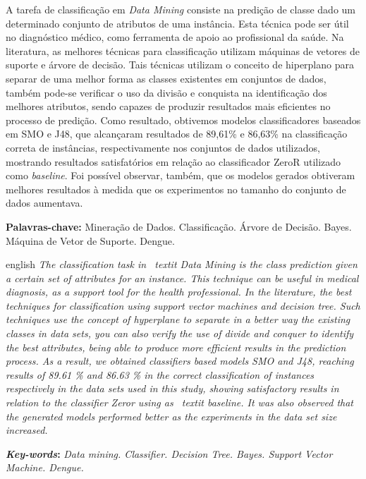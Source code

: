 \documentclass[
	12pt,				%
	openright,			%
	oneside,	
	a4paper,				%
	english,				%
	brazil				%
]{abntex2/abntex2} %
\begin{document}
\setlength{\absparsep}{18pt} %
\begin{resumo}

 	A tarefa de classificação em \textit{Data Mining} consiste na predição de classe dado um determinado conjunto de atributos de uma instância. Esta técnica pode ser útil no diagnóstico médico, como ferramenta de apoio ao profissional da saúde. Na literatura, as melhores técnicas para classificação utilizam máquinas de vetores de suporte e árvore de decisão. Tais técnicas utilizam o conceito de hiperplano para separar de uma melhor forma as classes existentes em conjuntos de dados, também pode-se verificar o uso da divisão e conquista na identificação dos melhores atributos, sendo capazes de produzir resultados mais eficientes no processo de predição. Como resultado, obtivemos modelos classificadores baseados em SMO e J48, que alcançaram resultados de 89,61\% e 86,63\% na classificação correta de instâncias, respectivamente nos conjuntos de dados utilizados, mostrando resultados satisfatórios em relação ao classificador ZeroR utilizado como \textit{baseline}. Foi possível observar, também, que os modelos gerados obtiveram melhores resultados à medida que os experimentos no tamanho do conjunto de dados aumentava.

 \textbf{Palavras-chave:} Mineração de Dados. Classificação. Árvore de Decisão. Bayes. Máquina de Vetor de Suporte. Dengue.

\end{resumo}


\begin{resumo}[ABSTRACT]
 \begin{otherlanguage*}{english}
   \textit{The classification task in \ textit {Data Mining} is the class prediction given a certain set of attributes for an instance. This technique can be useful in medical diagnosis, as a support tool for the health professional. In the literature, the best techniques for classification using support vector machines and decision tree. Such techniques use the concept of hyperplane to separate in a better way the existing classes in data sets, you can also verify the use of divide and conquer to identify the best attributes, being able to produce more efficient results in the prediction process. As a result, we obtained classifiers based models SMO and J48, reaching results of 89.61 \% and 86.63 \% in the correct classification of instances respectively in the data sets used in this study, showing satisfactory results in relation to the classifier Zeror using as \ textit {baseline}. It was also observed that the generated models performed better as the experiments in the data set size increased.}

   \vspace{\onelineskip}
 
   \noindent 
   \textbf{\textit{Key-words}:} \textit{Data mining. Classifier. Decision Tree. Bayes. Support Vector Machine. Dengue.}
 \end{otherlanguage*}
\end{resumo}
\end{document}
